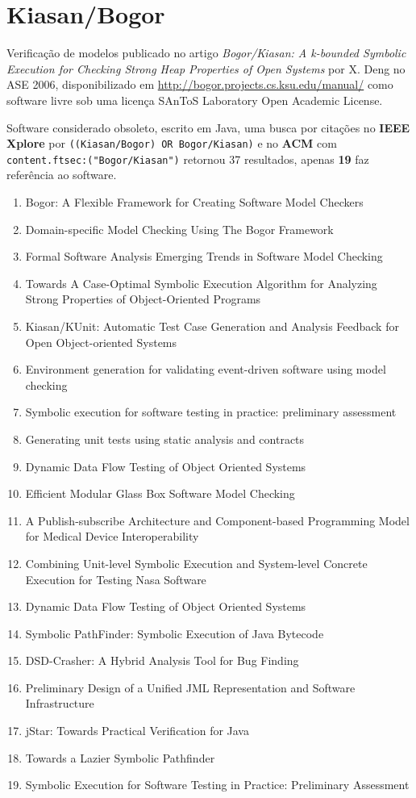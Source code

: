 \section{Kiasan/Bogor}

Verificação de modelos
publicado no artigo {\it Bogor/Kiasan: A k-bounded Symbolic Execution for Checking Strong Heap Properties of Open Systems}
por X. Deng
no ASE 2006,
disponibilizado em \url{http://bogor.projects.cs.ksu.edu/manual/}
como software livre
sob uma licença SAnToS Laboratory Open Academic License.

Software considerado obsoleto,
escrito em Java,
uma busca por citações no {\bf IEEE Xplore} por
\texttt{((Kiasan/Bogor) OR Bogor/Kiasan)}
e no {\bf ACM} com
\texttt{content.ftsec:("Bogor/Kiasan")}
retornou
37 resultados, apenas
{\bf 19} faz referência ao software.

\begin{enumerate}
\item Bogor: A Flexible Framework for Creating Software Model Checkers
\item Domain-specific Model Checking Using The Bogor Framework
\item Formal Software Analysis Emerging Trends in Software Model Checking
\item Towards A Case-Optimal Symbolic Execution Algorithm for Analyzing Strong Properties of Object-Oriented Programs
\item Kiasan/KUnit: Automatic Test Case Generation and Analysis Feedback for Open Object-oriented Systems
\item Environment generation for validating event-driven software using model checking
\item Symbolic execution for software testing in practice: preliminary assessment
\item Generating unit tests using static analysis and contracts
\item Dynamic Data Flow Testing of Object Oriented Systems
\item Efficient Modular Glass Box Software Model Checking
\item A Publish-subscribe Architecture and Component-based Programming Model for Medical Device Interoperability
\item Combining Unit-level Symbolic Execution and System-level Concrete Execution for Testing Nasa Software
\item Dynamic Data Flow Testing of Object Oriented Systems
\item Symbolic PathFinder: Symbolic Execution of Java Bytecode
\item DSD-Crasher: A Hybrid Analysis Tool for Bug Finding
\item Preliminary Design of a Unified JML Representation and Software Infrastructure
\item jStar: Towards Practical Verification for Java
\item Towards a Lazier Symbolic Pathfinder
\item Symbolic Execution for Software Testing in Practice: Preliminary Assessment
\end{enumerate}


